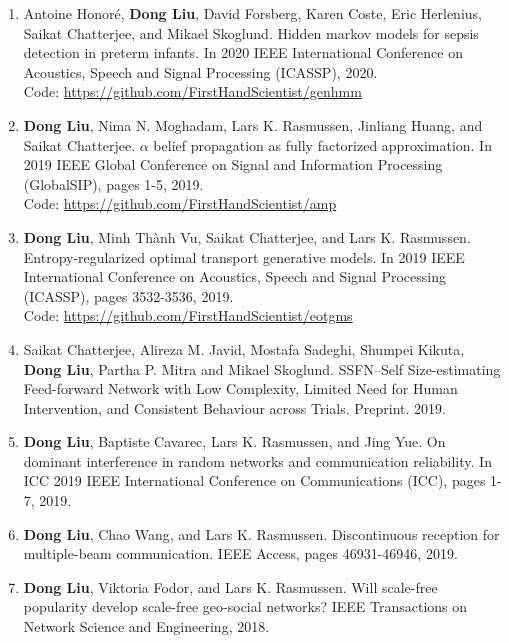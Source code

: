 \begin{enumerate}
\item \label{pub-hmm-sepsis} Antoine Honor{\'e}, \textbf{Dong Liu}, David Forsberg, Karen Coste, Eric Herlenius, Saikat Chatterjee, and Mikael Skoglund. Hidden markov models for sepsis detection in preterm infants. In 2020 IEEE International Conference on Acoustics, Speech and Signal Processing (ICASSP), 2020.\\
  Code: \href{https://github.com/FirstHandScientist/genhmm}{https://github.com/FirstHandScientist/genhmm}

\item \label{pub-abp} \textbf{Dong Liu}, Nima N. Moghadam, Lars K. Rasmussen, Jinliang Huang, and Saikat Chatterjee. $\alpha$ belief propagation as fully factorized approximation. In 2019 IEEE Global Conference on Signal and Information Processing (GlobalSIP), pages 1-5, 2019.\\
  Code: \href{https://github.com/FirstHandScientist/amp}{https://github.com/FirstHandScientist/amp}

\item \label{pub-eot-gm} \textbf{Dong Liu}, Minh Th\`{a}nh Vu, Saikat Chatterjee, and Lars K. Rasmussen. Entropy-regularized
  optimal transport generative models. In 2019 IEEE International Conference on Acoustics,
  Speech and Signal Processing (ICASSP), pages 3532-3536, 2019.\\
  Code: \href{https://github.com/FirstHandScientist/eotgms}{https://github.com/FirstHandScientist/eotgms}

\item Saikat Chatterjee, Alireza M. Javid, Mostafa Sadeghi, Shumpei Kikuta, \textbf{Dong Liu}, Partha P. Mitra and Mikael Skoglund. SSFN--Self Size-estimating Feed-forward Network with Low Complexity, Limited Need for Human Intervention, and Consistent Behaviour across Trials. Preprint. 2019.
  
  
\item \textbf{Dong Liu}, Baptiste Cavarec, Lars K. Rasmussen, and Jing Yue. On dominant interference in random networks and communication reliability. In ICC 2019 IEEE International Conference on Communications (ICC), pages 1-7, 2019.
  
\item \textbf{Dong Liu}, Chao Wang, and Lars K. Rasmussen. Discontinuous reception for multiple-beam communication. IEEE Access, pages 46931-46946, 2019.
  
\item \textbf{Dong Liu}, Viktoria Fodor, and Lars K. Rasmussen. Will scale-free popularity develop scale-free geo-social networks? IEEE Transactions on Network Science and Engineering, 2018.
\end{enumerate}


